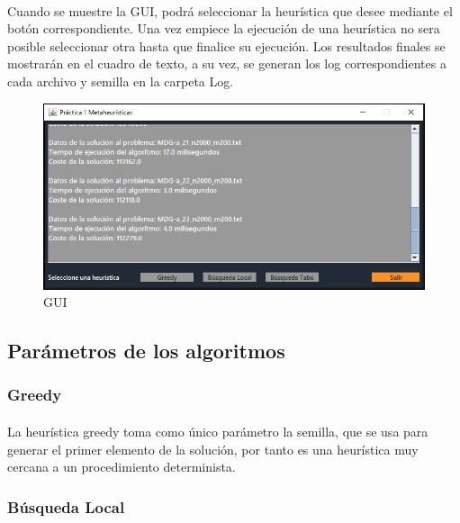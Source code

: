 \documentclass{article}
\begin{document}
	\paragraph{}Cuando se muestre la GUI, podrá seleccionar la heurística que desee mediante el botón correspondiente. Una vez empiece la ejecución de una heurística no sera posible seleccionar otra hasta que finalice su ejecución. Los resultados finales se mostrarán en el cuadro de texto, a su vez, se generan los log correspondientes a cada archivo y semilla en la carpeta Log.
	
	\begin{figure}[H]
		
		\centering
		\includegraphics[scale=0.4]{img/GUI}
		\caption{GUI}
		
	\end{figure}
	
	\subsection{Parámetros de los algoritmos}
	
	\subsubsection{Greedy}
	
	\paragraph{}La heurística greedy toma como único parámetro la semilla, que se usa para generar el primer elemento de la solución, por tanto es una heurística muy cercana a un procedimiento determinista.
	
	\subsubsection{Búsqueda Local}
	
\end{document}
